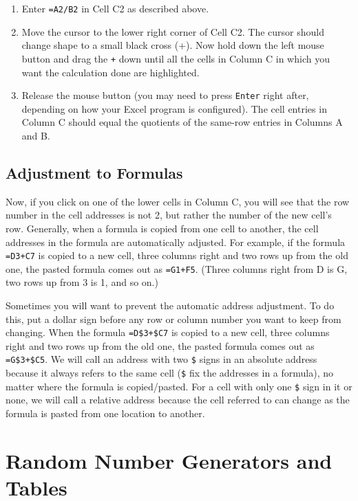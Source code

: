 \documentclass[
]{book}
\providecommand{\tightlist}{%
  \setlength{\itemsep}{0pt}\setlength{\parskip}{0pt}}
\begin{document}
\begin{enumerate}
\def\labelenumi{\arabic{enumi}.}
\tightlist
\item
  Enter \texttt{=A2/B2} in Cell C2 as described above.
\item
  Move the cursor to the lower right corner of Cell C2. The cursor should change shape to a small black cross (+). Now hold down the left mouse button and drag the \texttt{+} down until all the cells in Column C in which you want the calculation done are highlighted.
\item
  Release the mouse button (you may need to press \texttt{Enter} right after, depending on how your Excel program is configured). The cell entries in Column C should equal the quotients of the same-row entries in Columns A and B.
\end{enumerate}

\hypertarget{adjustment-to-formulas}{%
\section{Adjustment to Formulas}\label{adjustment-to-formulas}}

Now, if you click on one of the lower cells in Column C, you will see that the row number in the cell addresses is not 2, but rather the number of the new cell's row. Generally, when a formula is copied from one cell to another, the cell addresses in the formula are automatically adjusted. For example, if the formula \texttt{=D3+C7} is copied to a new cell, three columns right and two rows up from the old one, the pasted formula comes out as \texttt{=G1+F5}. (Three columns right from D is G, two rows up from 3 is 1, and so on.)

Sometimes you will want to prevent the automatic address adjustment. To do this, put a dollar sign before any row or column number you want to keep from changing. When the formula \texttt{=D\$3+\$C7} is copied to a new cell, three columns right and two rows up from the old one, the pasted formula comes out as \texttt{=G\$3+\$C5}. We will call an address with two \texttt{\$} signs in an absolute address because it always refers to the same cell (\texttt{\$} fix the addresses in a formula), no matter where the formula is copied/pasted. For a cell with only one \texttt{\$} sign in it or none, we will call a relative address because the cell referred to can change as the formula is pasted from one location to another.

\hypertarget{number-gen}{%
\chapter{Random Number Generators and Tables}\label{number-gen}}
\end{document}
